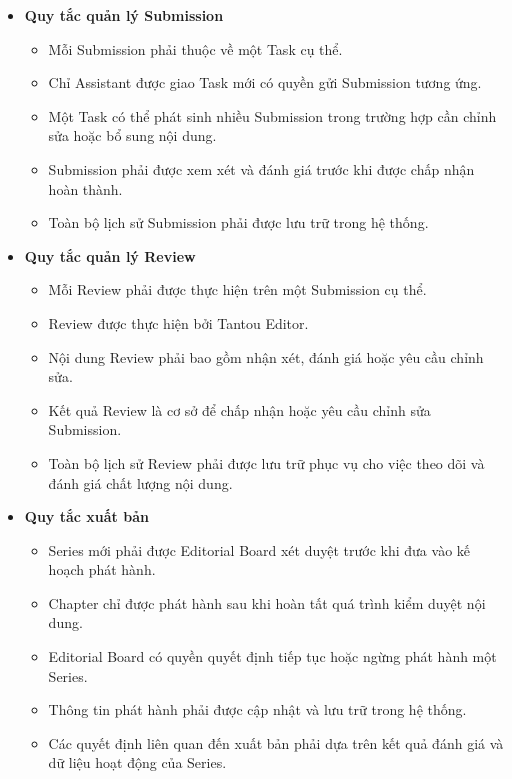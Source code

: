 \begin{itemize}
\begin{itemize}
        \item Chỉ Mangaka mới có quyền tạo, cập nhật hoặc hủy Task.
        \item Tiến độ thực hiện của Task phải được cập nhật và theo dõi trong hệ thống.
    \end{itemize}
    \item \textbf{Quy tắc quản lý Submission}
    \begin{itemize}
        \item Mỗi Submission phải thuộc về một Task cụ thể.
        \item Chỉ Assistant được giao Task mới có quyền gửi Submission tương ứng.
        \item Một Task có thể phát sinh nhiều Submission trong trường hợp cần chỉnh sửa hoặc bổ sung nội dung.
        \item Submission phải được xem xét và đánh giá trước khi được chấp nhận hoàn thành.
        \item Toàn bộ lịch sử Submission phải được lưu trữ trong hệ thống.
    \end{itemize}
    \item \textbf{Quy tắc quản lý Review}
    \begin{itemize}
        \item Mỗi Review phải được thực hiện trên một Submission cụ thể.
        \item Review được thực hiện bởi Tantou Editor.
        \item Nội dung Review phải bao gồm nhận xét, đánh giá hoặc yêu cầu chỉnh sửa.
        \item Kết quả Review là cơ sở để chấp nhận hoặc yêu cầu chỉnh sửa Submission.
        \item Toàn bộ lịch sử Review phải được lưu trữ phục vụ cho việc theo dõi và đánh giá chất lượng nội dung.
    \end{itemize}
    \item \textbf{Quy tắc xuất bản}
    \begin{itemize}
        \item Series mới phải được Editorial Board xét duyệt trước khi đưa vào kế hoạch phát hành.
        \item Chapter chỉ được phát hành sau khi hoàn tất quá trình kiểm duyệt nội dung.
        \item Editorial Board có quyền quyết định tiếp tục hoặc ngừng phát hành một Series.
        \item Thông tin phát hành phải được cập nhật và lưu trữ trong hệ thống.
        \item Các quyết định liên quan đến xuất bản phải dựa trên kết quả đánh giá và dữ liệu hoạt động của Series.

\end{itemize}
\end{itemize}
